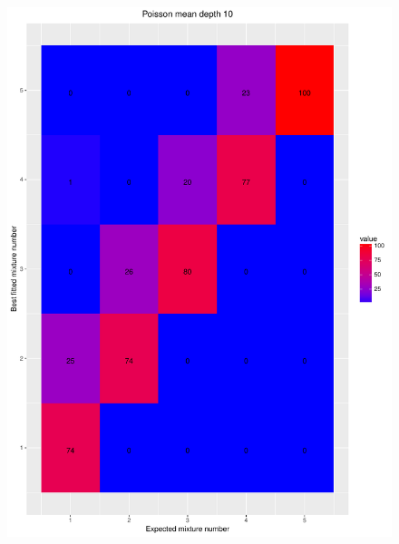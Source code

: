 \documentclass[11pt]{article}
\begin{document}
\begin{figure}[H]
\begin{center}
\includegraphics[scale=0.27]{../Results/Second_Analysis/Poisson_Confusion_Matrix_10.pdf}

\end{center}
\end{figure}
\end{document}
